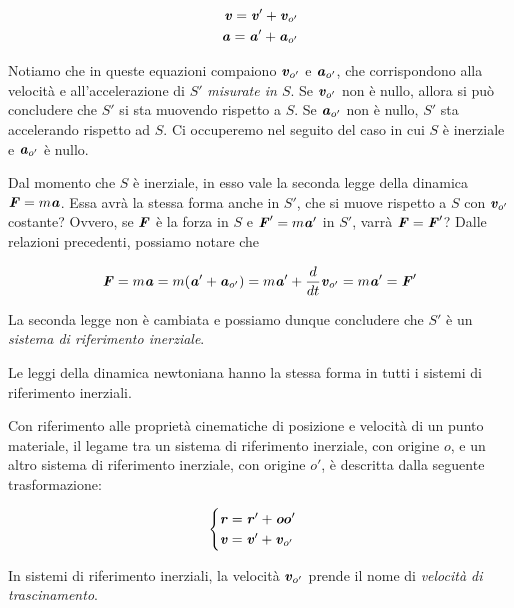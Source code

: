 \begin{align}
    \textbf{\textit{v}} = \textbf{\textit{v}}' + \textbf{\textit{v}}_{o'}\\
    \textbf{\textit{a}} = \textbf{\textit{a}}' + \textbf{\textit{a}}_{o'}
\end{align}

\noindent Notiamo che in queste equazioni compaiono $\textbf{\textit{v}}_{o'}$
e $\textbf{\textit{a}}_{o'}$, che corrispondono alla velocità e all'accelerazione
di $S'$ \emph{misurate in $S$}. Se $\textbf{\textit{v}}_{o'}$ non è nullo, allora
si può concludere che $S'$ si sta muovendo rispetto a $S$. Se $\textbf{\textit{a}}_{o'}$
non è nullo, $S'$ sta accelerando rispetto ad $S$. Ci occuperemo nel seguito del
caso in cui $S$ è inerziale e $\textbf{\textit{a}}_{o'}$ è nullo.

Dal momento che $S$ è inerziale, in esso vale la seconda legge della
dinamica $\textbf{\textit{F}} = m\textbf{\textit{a}}$. Essa avrà la stessa forma anche
in $S'$, che si muove rispetto a $S$ con $\textbf{\textit{v}}_{o'}$ costante?
Ovvero, se $\textbf{\textit{F}}$ è la forza in $S$ e $\textbf{\textit{F}}' = m\textbf{\textit{a}}'$ in $S'$,
varrà $\textbf{\textit{F}} = \textbf{\textit{F}}'$?
Dalle relazioni precedenti, possiamo notare che

\[ \textbf{\textit{F}} = m\textbf{\textit{a}} = m(\textbf{\textit{a}}' + \textbf{\textit{a}}_{o'}) = m\textbf{\textit{a}}' + \frac{d}{dt}\textbf{\textit{v}}_{o'} = m\textbf{\textit{a}}' = \textbf{\textit{F}}' \]

\noindent La seconda legge non è cambiata e possiamo dunque concludere
che $S'$ è un \textit{sistema di riferimento inerziale}.

\begin{tcolorbox}[colback = yellow!30, colframe = yellow!30!black, title = {Principio dei relatività galileiana}]
Le leggi della dinamica newtoniana hanno la stessa forma in tutti i
sistemi di riferimento inerziali.

Con riferimento alle proprietà cinematiche di posizione e velocità di
un punto materiale, il legame tra un sistema di riferimento inerziale,
con origine $o$, e un altro sistema di riferimento inerziale, con
origine $o'$, è descritta dalla seguente trasformazione:

\begin{align}
\begin{cases}
    \textbf{\textit{r}} = \textbf{\textit{r}}' + \textbf{\textit{oo}}'\\
    \textbf{\textit{v}} = \textbf{\textit{v}}' + \textbf{\textit{v}}_{o'}
\end{cases}
\end{align}
\end{tcolorbox}

\noindent In sistemi di riferimento inerziali, la velocità $\textbf{\textit{v}}_{o'}$
prende il nome di \textit{velocità di trascinamento}.


